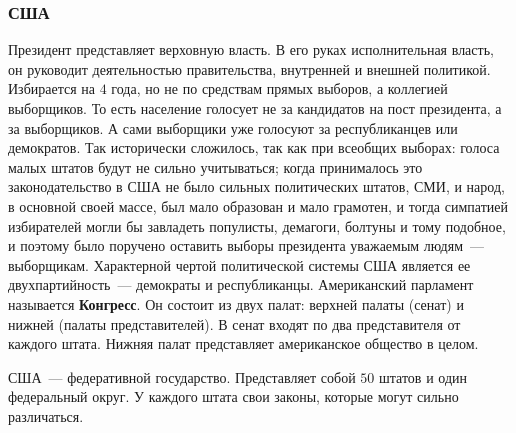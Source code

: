 \documentclass[12pt]{article}
\begin{document}
	\subsubsection{США}
	\begin{note}
		Президент представляет верховную власть. В его руках исполнительная власть, он руководит деятельностью правительства, внутренней и внешней политикой. Избирается на $4$ года, но не по средствам прямых выборов, а коллегией выборщиков. То есть население голосует не за кандидатов на пост президента, а за выборщиков. А сами выборщики уже голосуют за республиканцев или демократов. Так исторически сложилось, так как при всеобщих выборах: голоса малых штатов будут не сильно учитываться; когда принималось это законодательство в США не было сильных политических штатов, СМИ, и народ, в основной своей массе, был мало образован и мало грамотен, и тогда симпатией избирателей могли бы завладеть популисты, демагоги, болтуны и тому подобное, и поэтому было поручено оставить выборы президента уважаемым людям~--- выборщикам. Характерной чертой политической системы США является ее двухпартийность~--- демократы и республиканцы. Американский парламент называется \textbf{Конгресс}. Он состоит из двух палат: верхней палаты (сенат) и нижней (палаты представителей). В сенат входят по два представителя от каждого штата. Нижняя палат представляет американское общество в целом.
	\end{note}
	\begin{note}
		США~--- федеративной государство. Представляет собой $50$ штатов и один федеральный округ. У каждого штата свои законы, которые могут сильно различаться.
	\end{note}
\end{document}
